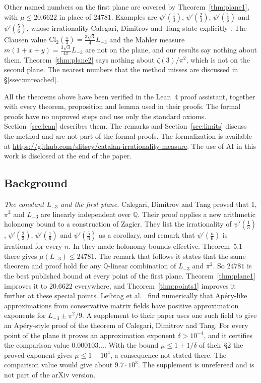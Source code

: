 \documentclass[11pt]{amsart}
\newcommand{\FormalizationURL}{https://github.com/slitsey/catalan-irrationality-measure}
\newcommand{\FormalizationLink}{\url{\FormalizationURL}}
\theoremstyle{definition}
\theoremstyle{remark}
\numberwithin{equation}{section}
\newcommand{\Q}{\mathbb Q}
\newcommand{\Lt}{L_{-3}}             %
\newcommand{\MuPlaneA}{20.6622}
\begin{document}
Other named numbers on the first plane are covered by Theorem~\ref{thm:plane1}, with $\mu\le\MuPlaneA$ in place of
$24781$. Examples are $\psi'(\frac13)$, $\psi'(\frac23)$, $\psi'(\frac16)$ and $\psi'(\frac56)$, whose irrationality
Calegari, Dimitrov and Tang state explicitly \cite[Corollary~B]{CDT2024}. The Clausen value
$\mathrm{Cl}_2(\frac\pi3)=\frac{3\sqrt3}4\Lt$ and the Mahler measure $m(1+x+y)=\frac{3\sqrt3}{4\pi}\Lt$ are not on the
plane, and our results say nothing about them. Theorem~\ref{thm:plane2} says nothing about
$\zeta(3)/\pi^2$, which is not on the second plane. The nearest numbers that the method misses are
discussed in \S\ref{ssec:unreached}.

All the theorems above have been verified in the Lean~4 proof assistant, together with every theorem, proposition and
lemma used in their proofs. The formal proofs have no unproved steps and use only the standard axioms.
Section~\ref{sec:lean} describes them. The remarks and Section~\ref{sec:limits} discuss the method and are not part of
the formal proofs. The formalization is available at \FormalizationLink. The use of AI in this work is disclosed at the
end of the paper.

\subsection{Background}\label{ssec:background}
\emph{The constant $\Lt$ and the first plane.} Calegari, Dimitrov and Tang \cite{CDT2024} proved that $1$, $\pi^2$ and
$\Lt$ are linearly independent over $\Q$. Their proof applies a new arithmetic holonomy bound to a construction of
Zagier. They list the irrationality of $\psi'(\frac13)$, $\psi'(\frac23)$, $\psi'(\frac16)$ and $\psi'(\frac56)$ as a
corollary, and remark that $\psi'(\frac n6)$ is irrational for every $n$. In \cite{CDT2025} they made holonomy bounds
effective. Theorem~5.1 there gives $\mu(\Lt)\le24781$. The remark that follows it states that the same theorem and
proof hold for any $\Q$-linear combination of $\Lt$ and $\pi^2$. So $24781$ is the best published bound at every point
of the first plane. Theorem~\ref{thm:plane1} improves it to $\MuPlaneA$ everywhere, and Theorem~\ref{thm:points1}
improves it further at these special points. Leibtag et al.\ \cite{LBKWSK26} find numerically that Ap\'ery-like
approximations from conservative matrix fields have positive approximation exponents for $\Lt\pm\pi^2/9$. A supplement
to their paper uses one such field to give an Ap\'ery-style proof of the theorem of Calegari, Dimitrov and Tang. For
every point of the plane it proves an approximation exponent $\delta>10^{-4}$, and it certifies the comparison value
$0.000103\ldots$. With the bound $\mu\le1+1/\delta$ of their \S2 the proved exponent gives $\mu\le1+10^4$, a
consequence not stated there. The comparison value would give about $9.7\cdot10^3$. The
supplement is unrefereed and is not part of the arXiv version.
\end{document}
